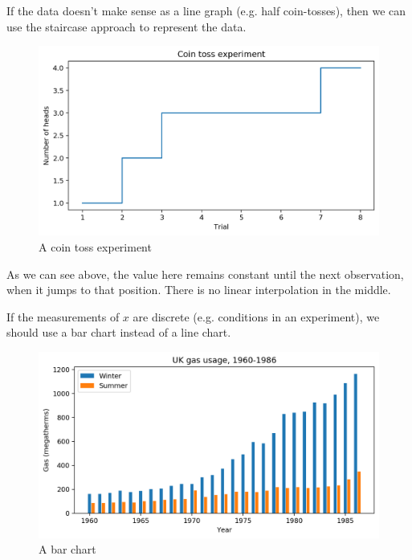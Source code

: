 \documentclass[a4paper, openany]{memoir}
\begin{document}
If the data doesn't make sense as a line graph (e.g. half coin-tosses), then we can use the staircase approach to represent the data.
\begin{figure}[H]
    \centering
    \includegraphics[scale=0.45]{src/2.49 coin toss jump.png}
    \caption{A coin toss experiment}
\end{figure}
\noindent As we can see above, the value here remains constant until the next observation, when it jumps to that position. There is no linear interpolation in the middle.

If the measurements of $x$ are discrete (e.g. conditions in an experiment), we should use a bar chart instead of a line chart.
\begin{figure}[H]
    \centering
    \includegraphics[scale=0.45]{src/2.50 bar chart.png}
    \caption{A bar chart}
\end{figure}
\end{document}
